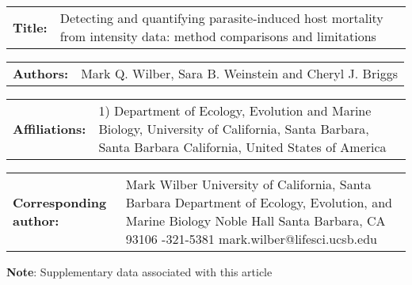 \documentclass[12pt, a4paper]{article}
\begin{document}
\linenumbers

\setlength{\parindent}{0in}
\renewcommand{\arraystretch}{2}
\begin{tabular}{p{3cm} p{10cm}}

\textbf{Title:} & Detecting and quantifying parasite-induced host mortality from intensity data: method comparisons and limitations \\

\end{tabular}

\begin{tabular}{p{3cm} p{10cm}}

\textbf{Authors:} & Mark Q. Wilber, Sara B. Weinstein and Cheryl J. Briggs \\

\end{tabular}

\begin{tabular}{p{3cm} p{10cm}}

\textbf{Affiliations:} &
1) Department of Ecology, Evolution and Marine Biology, University of California,
Santa Barbara, Santa Barbara California, United States of America \\

\end{tabular}

\begin{tabular}{p{3cm} p{10cm}}

\textbf{Corresponding \newline author:} &
Mark Wilber \newline
University of California, Santa Barbara \newline
Department of Ecology, Evolution, and Marine Biology \newline
2111 Noble Hall \newline
Santa Barbara, CA 93106 \newline
505-321-5381 \newline
mark.wilber@lifesci.ucsb.edu \newline


\end{tabular}

\textbf{Note}: Supplementary data associated with this article



\end{document}
